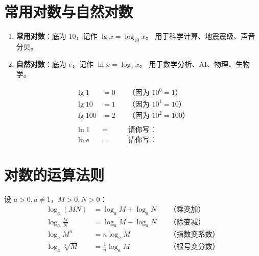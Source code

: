 \section{常用对数与自然对数}

\begin{definitionbox}[两种最重要的对数]
\begin{enumerate}
  \item \textbf{常用对数}：底为 10，记作 \(\lg x = \log_{10} x\)。
        用于科学计算、地震震级、声音分贝。
  \item \textbf{自然对数}：底为 \(e\)，记作 \(\ln x = \log_e x\)。
        用于数学分析、AI、物理、生物学。
\end{enumerate}
\end{definitionbox}

\begin{examplebox}
\begin{align*}
  \lg 1 &= 0 \quad &\text{（因为 } 10^0 = 1\text{）} \\
  \lg 10 &= 1 \quad &\text{（因为 } 10^1 = 10\text{）} \\
  \lg 100 &= 2 \quad &\text{（因为 } 10^2 = 100\text{）} \\
  \\
  \ln 1 &= \quad &\text{请你写：} \\
  \ln e &= \quad &\text{请你写：}
\end{align*}
\end{examplebox}


\section{对数的运算法则}

\begin{theorembox}[对数运算法则]
设 \(a > 0, a \neq 1\)，\(M > 0, N > 0\)：
\begin{align*}
  \log_a (MN) &= \log_a M + \log_a N \quad &\text{（乘变加）} \\
  \log_a \frac{M}{N} &= \log_a M - \log_a N \quad &\text{（除变减）} \\
  \log_a M^n &= n \log_a M \quad &\text{（指数变系数）} \\
  \log_a \sqrt[n]{M} &= \frac{1}{n} \log_a M \quad &\text{（根号变分数）}
\end{align*}
\end{theorembox}

